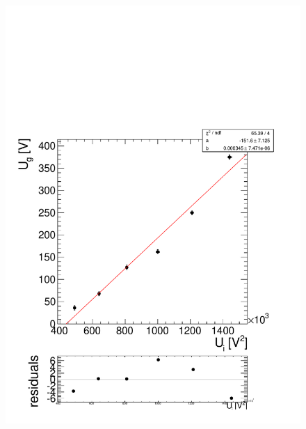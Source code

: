 \documentclass[a4paper,12pt]{article}
\begin{document}
\begin{figure}[htb]
		\centering
		\includegraphics[height = 0.3\textheight]{../analyse/stabilitaet1.pdf}

\end{figure}
\end{document}
